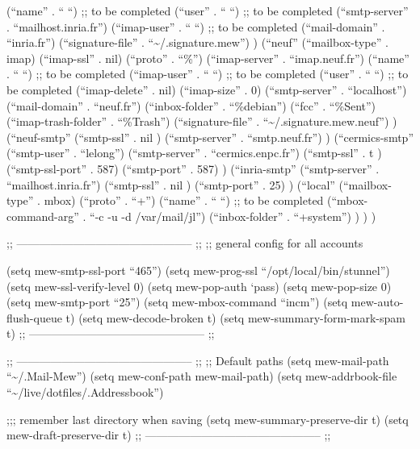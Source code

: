\documentclass[11pt]{article}
\begin{document}
         (``name'' . `` ``) ;; to be completed
         (``user'' . `` ``) ;; to be completed
         (``smtp-server'' . ``mailhost.inria.fr'')
         (``imap-user'' . `` ``) ;; to be completed
         (``mail-domain'' . ``inria.fr'')
         (``signature-file'' . ``\~{}/.signature.mew'')
         )
        (``neuf''
         (``mailbox-type'' . imap)
         (``imap-ssl'' . nil)
         (``proto'' . ``\%'')
         (``imap-server'' . ``imap.neuf.fr'')
         (``name'' . `` ``) ;; to be completed
         (``imap-user'' . `` ``) ;; to be completed
         (``user'' . `` ``) ;; to be completed
         (``imap-delete'' . nil)
         (``imap-size'' . 0)
         (``smtp-server'' . ``localhost'')
         (``mail-domain'' . ``neuf.fr'')
         (``inbox-folder'' . ``\%debian'')
         (``fcc'' . ``\%Sent'')
         (``imap-trash-folder'' . ``\%Trash'')
         (``signature-file'' . ``\~{}/.signature.mew.neuf'')
         )
        (``neuf-smtp''
         (``smtp-ssl'' . nil )
         (``smtp-server'' . ``smtp.neuf.fr'')
         )
        (``cermics-smtp''
         (``smtp-user'' . ``lelong'')
         (``smtp-server'' . ``cermics.enpc.fr'')
         (``smtp-ssl'' . t )
         (``smtp-ssl-port'' . 587)
         (``smtp-port'' . 587)
         )
        (``inria-smtp''
         (``smtp-server'' . ``mailhost.inria.fr'')
         (``smtp-ssl'' . nil )
         (``smtp-port'' . 25)
         )
        (``local''
         (``mailbox-type'' . mbox)
         (``proto'' . ``+'')
         (``name'' . `` ``) ;; to be completed
         (``mbox-command-arg'' . ``-c -u -d /var/mail/jl'')
         (``inbox-folder'' . ``+system'')
         )
        )
      )


;; ----------------------------------------------- ;;
;; general config for all accounts

(setq mew-smtp-ssl-port ``465'')
(setq mew-prog-ssl ``/opt/local/bin/stunnel'')
(setq mew-ssl-verify-level 0)
(setq mew-pop-auth `pass) 
(setq mew-pop-size 0)
(setq mew-smtp-port ``25'')
(setq mew-mbox-command ``incm'')
(setq mew-auto-flush-queue t)
(setq mew-decode-broken t)
(setq mew-summary-form-mark-spam t)
;; ----------------------------------------------- ;;


;; ----------------------------------------------- ;;
;; Default paths
(setq mew-mail-path ``\~{}/.Mail-Mew'')
(setq mew-conf-path mew-mail-path)
(setq mew-addrbook-file ``\~{}/live/dotfiles/.Addressbook'')

;;; remember last directory when saving
(setq mew-summary-preserve-dir t)
(setq mew-draft-preserve-dir t)
;; ----------------------------------------------- ;;
\end{document}
